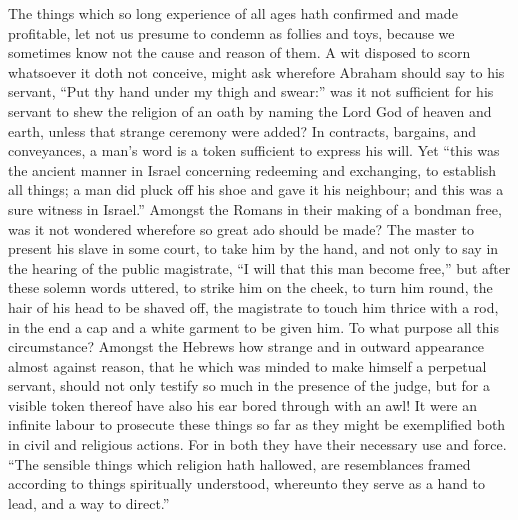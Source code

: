 The things which so long experience of all ages hath confirmed and made profitable, let not us presume to condemn as follies and toys, because we sometimes know not the cause and reason of them. A wit disposed to scorn whatsoever it doth not conceive, might ask wherefore Abraham should say to his servant, “Put thy hand under my thigh and swear:” was it not sufficient for his servant to shew the religion of an oath by naming the Lord God of heaven and earth, unless that strange ceremony were added? In contracts, bargains, and conveyances, a man’s word is a token sufficient to express his will. Yet “this was the ancient manner in Israel concerning redeeming and exchanging, to establish all things; a man did pluck off his shoe and gave it his neighbour; and this was a sure witness in Israel.” Amongst the Romans in their making of a bondman free, was it not wondered wherefore so great ado should be made? The master to present his slave in some court, to take him by the hand, and not only to say in the hearing of the public magistrate, “I will that this man become free,” but after these solemn words uttered, to strike him on the cheek, to turn him round, the hair of his head to be shaved off, the magistrate to touch him thrice with a rod, in the end a cap and a white garment to be given him. To what purpose all this circumstance? Amongst the Hebrews how strange and in outward appearance almost against reason, that he which was minded to make himself a perpetual servant, should not only testify  so much in the presence of the judge, but for a visible token thereof have also his ear bored through with an awl! It were an infinite labour to prosecute these things so far as they might be exemplified both in civil and religious actions. For in both they have their necessary use and force. “The sensible things which religion hath hallowed, are resemblances framed according to things spiritually understood, whereunto they serve as a hand to lead, and a way to direct.”

